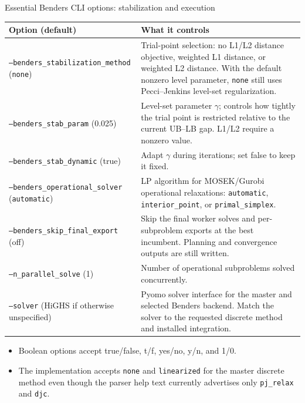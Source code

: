 \documentclass[aspectratio=169,10pt]{beamer}
\begin{document}
\begin{frame}{Essential Benders CLI options: stabilization and execution}
\scriptsize
\begin{tabular}{@{}p{}p{}@{}}
\toprule Option (default) & What it controls \\
\midrule
\texttt{--benders\_stabilization\_method} (\texttt{none}) & Trial-point selection: no L1/L2 distance objective, weighted L1 distance, or weighted L2 distance. With the default nonzero level parameter, \texttt{none} still uses Pecci--Jenkins level-set regularization. \\
\texttt{--benders\_stab\_param} (0.025) & Level-set parameter $\gamma$; controls how tightly the trial point is restricted relative to the current UB--LB gap. L1/L2 require a nonzero value. \\
\texttt{--benders\_stab\_dynamic} (true) & Adapt $\gamma$ during iterations; set false to keep it fixed. \\
\texttt{--benders\_operational\_solver} (\texttt{automatic}) & LP algorithm for MOSEK/Gurobi operational relaxations: \texttt{automatic}, \texttt{interior\_point}, or \texttt{primal\_simplex}. \\
\texttt{--benders\_skip\_final\_export} (off) & Skip the final worker solves and per-subproblem exports at the best incumbent. Planning and convergence outputs are still written. \\
\texttt{--n\_parallel\_solve} (1) & Number of operational subproblems solved concurrently. \\
\texttt{--solver} (HiGHS if otherwise unspecified) & Pyomo solver interface for the master and selected Benders backend. Match the solver to the requested discrete method and installed integration. \\
\bottomrule
\end{tabular}
\vspace{1mm}
\begin{itemize}
\item Boolean options accept true/false, t/f, yes/no, y/n, and 1/0.
\item The implementation accepts \texttt{none} and \texttt{linearized} for the master discrete method even though the parser help text currently advertises only \texttt{pj\_relax} and \texttt{djc}.
\end{itemize}
\end{frame}
\end{document}
